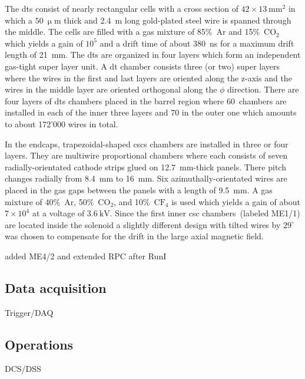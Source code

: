 The \glspl{dt} consist of nearly rectangular cells with a cross section of $42\times 13~\mathrm{mm}^{2}$ in which a $50~\upmu\mathrm{m}$ thick and 2.4~m long gold-plated steel wire is spanned through the middle. The cells are filled with a gas mixture of 85\%~Ar and 15\%~$\mathrm{CO}_{2}$ which yields a gain of $10^{5}$ and a drift time of about 380~ns for a maximum drift length of 21~mm. The \glspl{dt} are organized in four layers which form an independent gas-tight super layer unit. A \gls{dt} chamber consists three (or two) super layers where the wires in the first and last layers are oriented along the z-axis and the wires in the middle layer are oriented orthogonal along the $\phi$ direction. There are four layers of \glspl{dt} chambers placed in the barrel region where 60~chambers are installed in each of the inner three layers and 70 in the outer one which amounts to about 172'000 wires in total. 

In the endcaps, trapezoidal-shaped \glspl{csc} chambers are installed in three or four layers. They are multiwire proportional chambers where each consists of seven radially-orientated cathode strips glued on 12.7~mm-thick panels. There pitch changes radially from 8.4~mm to 16~mm. Six azimuthally-orientated wires are placed in the gas gaps between the panels with a length of 9.5~mm. A gas mixture of 40\%~Ar, 50\%~$\mathrm{CO_{2}}$, and 10\%~$\mathrm{CF}_{4}$ is used which yields a gain of about $7\times10^{4}$ at a voltage of $3.6~\mathrm{kV}$. Since the first inner \gls{csc} chambers~(labeled ME1/1) are located inside the solenoid a slightly different design with tilted wires by $29^{\circ}$ was chosen to compensate for the drift in the large axial magnetic field.




added ME4/2 and extended RPC after RunI
  


\subsection{Data acquisition}
Trigger/DAQ

\subsection{Operations}
DCS/DSS
